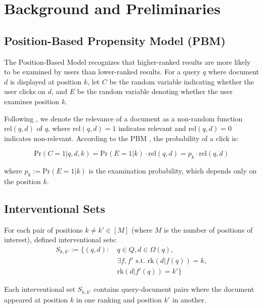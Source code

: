 \documentclass[sigconf]{acmart}
\begin{document}
\section{Background and Preliminaries}
\label{sec:background}

\subsection{Position-Based Propensity Model (PBM)}
The Position-Based Model recognizes that higher-ranked results are more likely to be examined by users than lower-ranked results. For a query $q$ where document $d$ is displayed at position $k$, let $C$ be the random variable indicating whether the user clicks on $d$, and $E$ be the random variable denoting whether the user examines position $k$.

Following \cite{agarwal2019estimating}, we denote the relevance of a document as a non-random function $\textrm{rel}(q,d)$ of $q$, where $\textrm{rel}(q,d) = 1$ indicates relevant and $\textrm{rel}(q,d) = 0$ indicates non-relevant. According to the PBM \cite{richardson2007predicting, chuklin2015click}, the probability of a click is:

\begin{equation}
\mathrm{Pr}(C = 1|q,d,k) = \mathrm{Pr}(E = 1|k) \cdot \textrm{rel}(q,d) = p_k \cdot \textrm{rel}(q,d)
\end{equation}

where $p_k := \mathrm{Pr}(E = 1|k)$ is the examination probability, which depends only on the position $k$.


\subsection{Interventional Sets}
\label{sec:intervention-harvesting}

For each pair of positions $k \neq k' \in [M]$ (where $M$ is the number of positions of interest), \cite{agarwal2019estimating} defined interventional sets:
\begin{align*}
S_{k,k'} := \{(q,d) :\ & q \in Q, d \in \Omega(q),\\
& \exists f,f' \textrm{ s.t. } \textrm{rk}(d|f(q))=k,\\
& \textrm{rk}(d|f'(q))=k'\}
\end{align*}

Each interventional set $S_{k,k'}$ contains query-document pairs where the document appeared at position $k$ in one ranking and position $k'$ in another.
\end{document}
